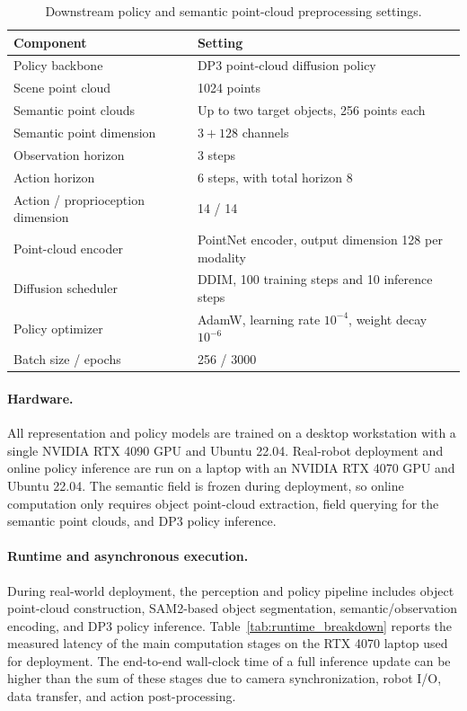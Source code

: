 \begin{table}[h]
\centering
\small
\caption{Downstream policy and semantic point-cloud preprocessing settings.}
\label{tab:policy_hparams}
\begin{tabular}{@{}ll@{}}
\toprule
Component & Setting \\
\midrule
Policy backbone & DP3 point-cloud diffusion policy \\
Scene point cloud & 1024 points \\
Semantic point clouds & Up to two target objects, 256 points each \\
Semantic point dimension & $3+128$ channels \\
Observation horizon & 3 steps \\
Action horizon & 6 steps, with total horizon 8 \\
Action / proprioception dimension & 14 / 14 \\
Point-cloud encoder & PointNet encoder, output dimension 128 per modality \\
Diffusion scheduler & DDIM, 100 training steps and 10 inference steps \\
Policy optimizer & AdamW, learning rate $10^{-4}$, weight decay $10^{-6}$ \\
Batch size / epochs & 256 / 3000 \\
\bottomrule
\end{tabular}
\end{table}

\paragraph{Hardware.}
All representation and policy models are trained on a desktop workstation with a single NVIDIA RTX 4090 GPU and Ubuntu 22.04. Real-robot deployment and online policy inference are run on a laptop with an NVIDIA RTX 4070 GPU and Ubuntu 22.04. The semantic field is frozen during deployment, so online computation only requires object point-cloud extraction, field querying for the semantic point clouds, and DP3 policy inference.

\paragraph{Runtime and asynchronous execution.}
During real-world deployment, the perception and policy pipeline includes object point-cloud construction, SAM2-based object segmentation, semantic/observation encoding, and DP3 policy inference. Table~\ref{tab:runtime_breakdown} reports the measured latency of the main computation stages on the RTX 4070 laptop used for deployment. The end-to-end wall-clock time of a full inference update can be higher than the sum of these stages due to camera synchronization, robot I/O, data transfer, and action post-processing.

